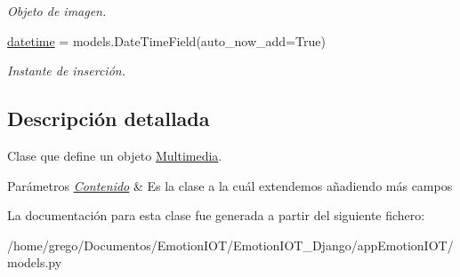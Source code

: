 \begin{DoxyCompactItemize}
\begin{DoxyCompactList}\small\item\em Objeto de imagen. \end{DoxyCompactList}\item 
\hyperlink{classappEmotionIOT_1_1models_1_1Multimedia_a8def042968909dd0e9f26eff62b9ac48}{datetime} = models.\+Date\+Time\+Field(auto\+\_\+now\+\_\+add=True)\hypertarget{classappEmotionIOT_1_1models_1_1Multimedia_a8def042968909dd0e9f26eff62b9ac48}{}\label{classappEmotionIOT_1_1models_1_1Multimedia_a8def042968909dd0e9f26eff62b9ac48}

\begin{DoxyCompactList}\small\item\em Instante de inserción. \end{DoxyCompactList}\end{DoxyCompactItemize}


\subsection{Descripción detallada}
Clase que define un objeto \hyperlink{classappEmotionIOT_1_1models_1_1Multimedia}{Multimedia}. 


\begin{DoxyParams}{Parámetros}
{\em \hyperlink{classappEmotionIOT_1_1models_1_1Contenido}{Contenido}} & Es la clase a la cuál extendemos añadiendo más campos \\
\hline
\end{DoxyParams}


La documentación para esta clase fue generada a partir del siguiente fichero\+:\begin{DoxyCompactItemize}
\item 
/home/grego/\+Documentos/\+Emotion\+I\+O\+T/\+Emotion\+I\+O\+T\+\_\+\+Django/app\+Emotion\+I\+O\+T/models.\+py\end{DoxyCompactItemize}
